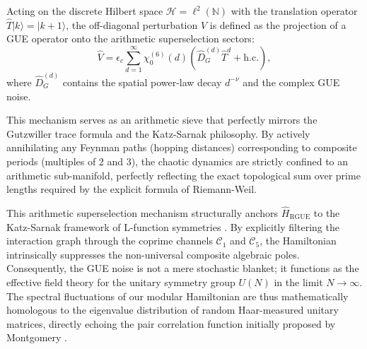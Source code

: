 \documentclass[aps,prl,preprint,superscriptaddress,floatfix]{revtex4-2}
\newcommand{\N}{\mathbb{N}}
\newcommand{\Hilb}{\mathcal{H}}
\begin{document}
Acting on the discrete Hilbert space $\Hilb = \ell^2(\N)$ with the translation operator $\hat{T}|k\rangle = |k+1\rangle$, the off-diagonal perturbation $\hat{V}$ is defined as the projection of a GUE operator onto the arithmetic superselection sectors:
\begin{equation}
\label{eq:interaction}
\hat{V} = \epsilon_c \sum_{d=1}^{\infty} \chi_0^{(6)}(d) \left( \hat{D}_G^{(d)} \hat{T}^d + \text{h.c.} \right),
\end{equation}
where $\hat{D}_G^{(d)}$ contains the spatial power-law decay $d^{-\nu}$ and the complex GUE noise. 

This mechanism serves as an arithmetic sieve that perfectly mirrors the Gutzwiller trace formula and the Katz-Sarnak philosophy. By actively annihilating any Feynman paths (hopping distances) corresponding to composite periods (multiples of 2 and 3), the chaotic dynamics are strictly confined to an arithmetic sub-manifold, perfectly reflecting the exact topological sum over prime lengths required by the explicit formula of Riemann-Weil.

This arithmetic superselection mechanism structurally anchors $\hat{H}_{\text{RGUE}}$ to the Katz-Sarnak framework of L-function symmetries \cite{KatzSarnak1999}. By explicitly filtering the interaction graph through the coprime channels $\mathcal{C}_1$ and $\mathcal{C}_5$, the Hamiltonian intrinsically suppresses the non-universal composite algebraic poles. Consequently, the GUE noise is not a mere stochastic blanket; it functions as the effective field theory for the unitary symmetry group $U(N)$ in the limit $N \to \infty$. The spectral fluctuations of our modular Hamiltonian are thus mathematically homologous to the eigenvalue distribution of random Haar-measured unitary matrices, directly echoing the pair correlation function initially proposed by Montgomery \cite{Montgomery1973}.
\end{document}
